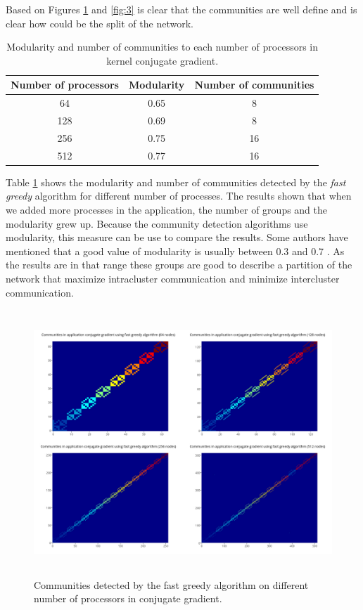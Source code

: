 \documentclass[journal]{IEEEtran}
\begin{document}
\begin{NoHyper}
Based on Figures \ref{fig:2} and \ref{fig:3} is clear that the communities are well define and is clear how could be the split of the network.

\begin{table}[h!]
\begin{center}
 \begin{tabular}{||c || c|| c ||} 
 \hline
 Number of processors&Modularity&Number of communities \\ [0.5ex] 
 \hline\hline
64 &	0.65 & 8	\\
 \hline
128	&	0.69 & 8\\
 \hline
256	&	0.75 & 16\\
 \hline
512	& 0.77 & 16\\
 \hline
\end{tabular}
 \caption{Modularity and number of communities to each number of processors in kernel conjugate gradient.}
 \label{table:1}
\end{center}
\end{table}

Table \ref{table:1} shows the modularity and number of communities detected by the \textit{fast greedy} algorithm for different number of processes. The results shown that when we added more processes in the application, the number of groups and the modularity grew up. Because the community detection algorithms use modularity, this measure can be use to compare the results. Some authors have mentioned that a good value of modularity is usually between 0.3 and 0.7 \cite{NewGir04,Clauset}. As the results are in that range these groups are good to describe a partition of the network that maximize intracluster communication and minimize intercluster communication.

\begin{figure}[h!]
\includegraphics[width=\textwidth, height=10cm]{com_algorithms_cg_fg_64_128_256_512}
\caption{Communities detected by the fast greedy algorithm on different number of processors in conjugate gradient.}
\label{fig:2}
\end{figure}



\end{NoHyper}
\end{document}
